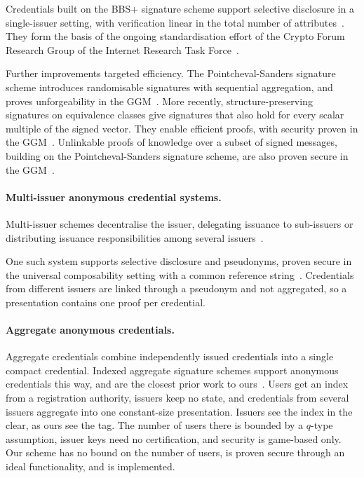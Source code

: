 Credentials built on the BBS+ signature scheme support selective disclosure in
a single-issuer setting, with verification linear in the total number of
attributes~\cite{EC:BonBoy04a,SCN:AuSusMu06}. They form the basis of the
ongoing standardisation effort of the Crypto Forum Research Group of the
Internet Research Task Force~\cite{bbsdraft}.

Further improvements targeted efficiency. The Pointcheval-Sanders signature
scheme introduces randomisable signatures with sequential aggregation, and
proves unforgeability in the GGM~\cite{RSA:PoiSan16}. More recently,
structure-preserving signatures on equivalence classes give signatures that
also hold for every scalar multiple of the signed vector. They enable efficient
proofs, with security proven in the GGM~\cite{JC:FucHanSla19}. Unlinkable
proofs of knowledge over a subset of signed messages, building on the
Pointcheval-Sanders signature scheme, are also proven secure in the
GGM~\cite{PKC:Sanders20}.

\paragraph{Multi-issuer anonymous credential systems.} Multi-issuer schemes
decentralise the issuer, delegating issuance to sub-issuers or distributing
issuance responsibilities among several
issuers~\cite{TCC:BCKL08,CCS:CamDriDub17,NDSS:SABMD19}.

One such system supports selective disclosure and pseudonyms, proven secure in
the universal composability setting with a common reference
string~\cite{AC:CDHK15}. Credentials from different issuers are linked through
a pseu\-do\-nym and not aggregated, so a presentation contains one proof per
credential.

\paragraph{Aggregate anonymous credentials.} Aggregate credentials combine
independently issued credentials into a single compact credential. Indexed
aggregate signature schemes support anonymous credentials this way, and are the
closest prior work to ours~\cite{canard2011anonymous}. Users get an index from
a registration authority, issuers keep no state, and credentials from several
issuers aggregate into one constant-size presentation. Issuers see the index in
the clear, as ours see the tag. The number of users there is bounded by a
$q$-type assumption, issuer keys need no certification, and security is
game-based only. Our scheme has no bound on the number of users, is proven
secure through an ideal functionality, and is implemented.


